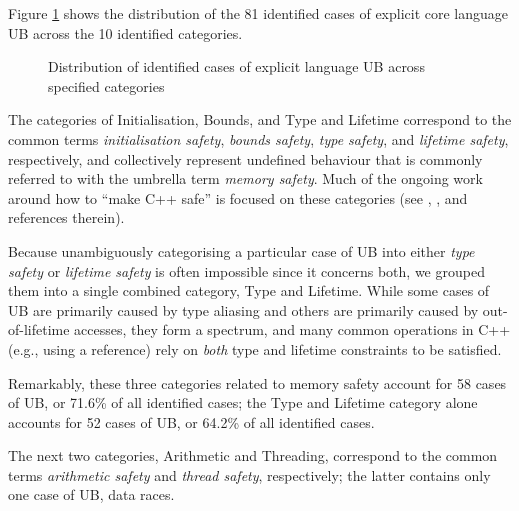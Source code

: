 Figure \ref{piechart_categories} shows the distribution of the 81 identified cases of explicit core language UB across the 10 identified categories. 

\begin{figure}[h]
    \label{piechart_categories}
    \centering
    \caption{Distribution of identified cases of explicit language UB across specified categories}
\end{figure}


The categories of Initialisation, Bounds, and Type and Lifetime correspond to the common terms \emph{initialisation safety}, \emph{bounds safety}, \emph{type safety},  and \emph{lifetime safety}, respectively, and collectively represent undefined behaviour that is commonly referred to with the umbrella term \emph{memory safety}. Much of the ongoing work around how to ``make C++ safe'' is focused on these  categories (see \cite{P3081R2}, \cite{P3700R0}, and references therein).

Because unambiguously categorising a particular case of UB into either \emph{type safety} or \emph{lifetime safety} is often impossible since it concerns both, we grouped them into a single combined category, Type and Lifetime. While some cases of UB are primarily caused by type aliasing and others are primarily caused by out-of-lifetime accesses, they form a spectrum, and many common operations in C++ (e.g., using a reference) rely on \emph{both} type and lifetime constraints to be satisfied.

Remarkably, these three categories related to memory safety account for 58 cases of UB, or 71.6\% of all identified cases; the Type and Lifetime category alone accounts for 52 cases of UB, or 64.2\% of all identified cases.

The next two categories, Arithmetic and Threading, correspond to the common terms \emph{arithmetic safety} and \emph{thread safety}, respectively; the latter contains only one case of UB, data races.

